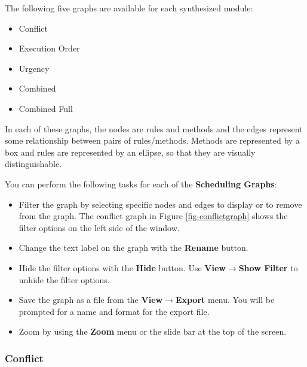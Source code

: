\documentclass{article}
\begin{document}
The following five graphs are available for each synthesized module:
\begin{itemize}
\item Conflict
\item Execution Order
\item Urgency
\item Combined
\item Combined Full
\end{itemize}

In each of these graphs, the nodes are rules and methods and the edges
represent some relationship between pairs of rules/methods.  Methods are represented by a box and rules are represented by
an ellipse, so that they are visually distinguishable.


 You can perform the following tasks for each of the {\bf Scheduling Graphs}:
\begin{itemize}
\item Filter the graph  by selecting
specific nodes and edges to display or to remove from the graph.  The  conflict
graph in Figure \ref{fig-conflictgraph} shows the filter options on
the left side of the window.

\item Change the text label on the graph with the {\bf Rename} button.

\item Hide the filter options with the  {\bf Hide} button.  Use {\bf
View$\rightarrow$Show Filter} to unhide the filter options.

\item Save the graph as a file from the  {\bf View$\rightarrow$Export}
menu.  You will be prompted for a name  and format for the export file.

\item  Zoom by using the {\bf Zoom} menu or the slide bar at
the top of the screen.
\end{itemize}


\subsubsection{Conflict}

\end{document}
